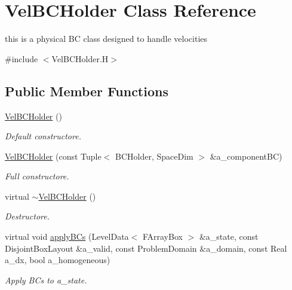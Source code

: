 \hypertarget{class_vel_b_c_holder}{\section{Vel\-B\-C\-Holder Class Reference}
\label{class_vel_b_c_holder}
}


this is a physical B\-C class designed to handle velocities  




{\ttfamily \#include $<$Vel\-B\-C\-Holder.\-H$>$}

\subsection*{Public Member Functions}
\begin{DoxyCompactItemize}
\item 
\hypertarget{class_vel_b_c_holder_af5fa130e47bbac1e8f01ef5e4ff8453d}{\hyperlink{class_vel_b_c_holder_af5fa130e47bbac1e8f01ef5e4ff8453d}{Vel\-B\-C\-Holder} ()}\label{class_vel_b_c_holder_af5fa130e47bbac1e8f01ef5e4ff8453d}

\begin{DoxyCompactList}\small\item\em Default constructore. \end{DoxyCompactList}\item 
\hypertarget{class_vel_b_c_holder_a8946f96dbe531366cb223f87678e3110}{\hyperlink{class_vel_b_c_holder_a8946f96dbe531366cb223f87678e3110}{Vel\-B\-C\-Holder} (const Tuple$<$ B\-C\-Holder, Space\-Dim $>$ \&a\-\_\-component\-B\-C)}\label{class_vel_b_c_holder_a8946f96dbe531366cb223f87678e3110}

\begin{DoxyCompactList}\small\item\em Full constructore. \end{DoxyCompactList}\item 
\hypertarget{class_vel_b_c_holder_a3c80e1db72a619f73d535f441824ee82}{virtual \hyperlink{class_vel_b_c_holder_a3c80e1db72a619f73d535f441824ee82}{$\sim$\-Vel\-B\-C\-Holder} ()}\label{class_vel_b_c_holder_a3c80e1db72a619f73d535f441824ee82}

\begin{DoxyCompactList}\small\item\em Destructore. \end{DoxyCompactList}\item 
\hypertarget{class_vel_b_c_holder_a917796c7b5448f28fb4a15eae90e86a3}{virtual void \hyperlink{class_vel_b_c_holder_a917796c7b5448f28fb4a15eae90e86a3}{apply\-B\-Cs} (Level\-Data$<$ F\-Array\-Box $>$ \&a\-\_\-state, const Disjoint\-Box\-Layout \&a\-\_\-valid, const Problem\-Domain \&a\-\_\-domain, const Real a\-\_\-dx, bool a\-\_\-homogeneous)}\label{class_vel_b_c_holder_a917796c7b5448f28fb4a15eae90e86a3}

\begin{DoxyCompactList}\small\item\em Apply B\-Cs to a\-\_\-state. \end{DoxyCompactList}\end{DoxyCompactItemize}
